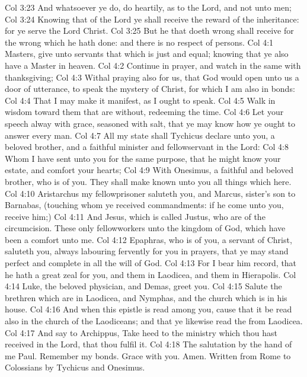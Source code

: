 \vs Col 3:23 And whatsoever ye do, do  heartily, as to the Lord, and not unto men;
\vs Col 3:24 Knowing that of the Lord ye shall receive the reward of the inheritance: for ye serve the Lord Christ.
\vs Col 3:25 But he that doeth wrong shall receive for the wrong which he hath done: and there is no respect of persons.
\vs Col 4:1 Masters, give unto  servants that which is just and equal; knowing that ye also have a Master in heaven.
\vs Col 4:2 Continue in prayer, and watch in the same with thanksgiving;
\vs Col 4:3 Withal praying also for us, that God would open unto us a door of utterance, to speak the mystery of Christ, for which I am also in bonds:
\vs Col 4:4 That I may make it manifest, as I ought to speak.
\vs Col 4:5 Walk in wisdom toward them that are without, redeeming the time.
\vs Col 4:6 Let your speech  alway with grace, seasoned with salt, that ye may know how ye ought to answer every man.
\vs Col 4:7 All my state shall Tychicus declare unto you,  a beloved brother, and a faithful minister and fellowservant in the Lord:
\vs Col 4:8 Whom I have sent unto you for the same purpose, that he might know your estate, and comfort your hearts;
\vs Col 4:9 With Onesimus, a faithful and beloved brother, who is  of you. They shall make known unto you all things which  here.
\vs Col 4:10 Aristarchus my fellowprisoner saluteth you, and Marcus, sister's son to Barnabas, (touching whom ye received commandments: if he come unto you, receive him;)
\vs Col 4:11 And Jesus, which is called Justus, who are of the circumcision. These only  fellowworkers unto the kingdom of God, which have been a comfort unto me.
\vs Col 4:12 Epaphras, who is  of you, a servant of Christ, saluteth you, always labouring fervently for you in prayers, that ye may stand perfect and complete in all the will of God.
\vs Col 4:13 For I bear him record, that he hath a great zeal for you, and them  in Laodicea, and them in Hierapolis.
\vs Col 4:14 Luke, the beloved physician, and Demas, greet you.
\vs Col 4:15 Salute the brethren which are in Laodicea, and Nymphas, and the church which is in his house.
\vs Col 4:16 And when this epistle is read among you, cause that it be read also in the church of the Laodiceans; and that ye likewise read the  from Laodicea.
\vs Col 4:17 And say to Archippus, Take heed to the ministry which thou hast received in the Lord, that thou fulfil it.
\vs Col 4:18 The salutation by the hand of me Paul. Remember my bonds. Grace  with you. Amen. Written from Rome to Colossians by Tychicus and Onesimus.
